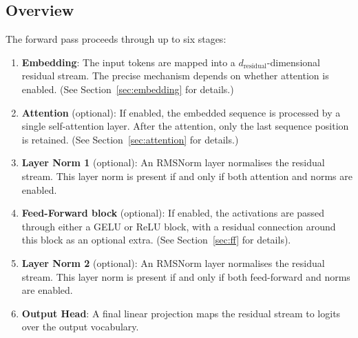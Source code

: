 \documentclass[11pt,a4paper]{article}
\begin{document}
\subsection{Overview}

The forward pass proceeds through up to six stages:
\begin{enumerate}
    \item \textbf{Embedding}: The input tokens are mapped into a $d_\text{residual}$-dimensional residual stream. The precise mechanism depends on whether attention is enabled. (See Section~\ref{sec:embedding} for details.)
    \item \textbf{Attention} (optional): If enabled, the embedded sequence is processed by a single self-attention layer. After the attention, only the last sequence position is retained. (See Section~\ref{sec:attention} for details.)
    \item \textbf{Layer Norm 1} (optional): An RMSNorm layer normalises the residual stream. This layer norm is present if and only if both attention and norms are enabled.
    \item \textbf{Feed-Forward block} (optional): If enabled, the activations are passed through either a GELU or ReLU block, with a residual connection around this block as an optional extra. (See Section~\ref{sec:ff} for details).
    \item \textbf{Layer Norm 2} (optional): An RMSNorm layer normalises the residual stream. This layer norm is present if and only if both feed-forward and norms are enabled.
    \item \textbf{Output Head}: A final linear projection maps the residual stream to logits over the output vocabulary. 
\end{enumerate}
\end{document}

